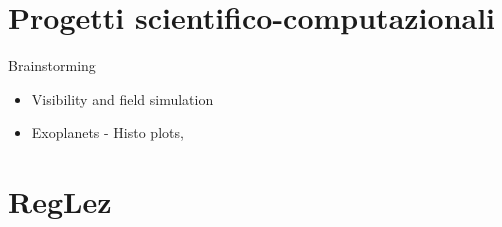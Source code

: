\section{Progetti scientifico-computazionali}

\begin{frame}{Brainstorming}
\begin{itemize}
    \item Visibility and field simulation
    \item Exoplanets - Histo plots, 
\end{itemize}
\end{frame}



\section{RegLez}
